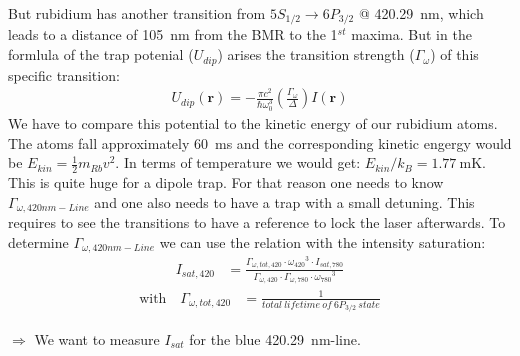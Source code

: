 But rubidium has another transition from \(5S_{1/2} \rightarrow 6P_{3/2}\) @
\SI{420.29}{\nano\meter}, which leads to a distance of \SI{105}{\nano\meter} from
the BMR to the 1\(^{st}\) maxima. But in the formlula \citep{grimm} of the trap potenial (\(U_{dip}\))
arises the transition strength (\(\Gamma_\omega \)) of this specific transition:
\bigskip
\begin{align}
    U_{dip}(\mathbf{r})=-\frac{\pi c^2}{\hbar\omega_0^3} \left( \frac{\Gamma_\omega}{\Delta} \right) I(\mathbf{r})
\end{align}
\bigskip
We have to compare this potential to the kinetic energy of our rubidium atoms. The atoms fall approximately
\SI{60}{\milli\second} and the corresponding kinetic engergy would be \(E_{kin} = \frac{1}{2} m_{Rb} v^2\).
In terms of temperature we would get: \(E_{kin} / k_B = \SI{1.77}{\milli\kelvin} \). This is quite huge
for a dipole trap. For that reason one needs to know \(\Gamma_{\omega,420nm-Line} \) and one also needs to have a trap
with a small detuning. This requires to see the transitions to have a reference to lock the laser afterwards.
\bigskip
To determine \(\Gamma_{\omega,420nm-Line} \) we can use the relation with the intensity saturation:
\begin{align}
    I_{sat,420} &= \frac{\Gamma_{\omega,tot,420}\cdot{\omega_{420}}^3\cdot I_{sat,780}}{\Gamma_{\omega,420}\cdot\Gamma_{\omega,780}\cdot{\omega_{780}}^3}
\end{align}
\begin{align*}
    \text{with~~~} \Gamma_{\omega,tot,420} &= \frac{1}{total~lifetime~of~6P_{3/2}~state}
\end{align*}
\medskip

\(\Rightarrow \) We want to measure \(I_{sat}\) for the blue \SI{420.29}{\nano\meter}-line. 

